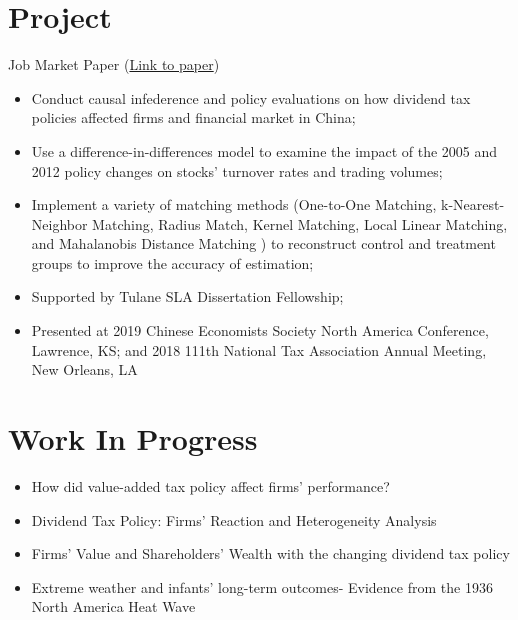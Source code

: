 \documentclass{resume}
\begin{document}
\section{Project}
Job Market Paper (\href{https://liberalarts.tulane.edu/sites/liberalarts.tulane.edu/files/sites/default/files/Xie%20JMP_0.pdf}{Link to paper})
\begin{itemize}
  \item Conduct causal infederence and policy evaluations on how dividend tax policies affected firms and financial market in China;
  \item Use a difference-in-differences model to examine the impact of the 2005 and 2012 policy changes on stocks’ turnover rates and trading volumes;
  \item Implement a variety of matching methods (One-to-One Matching, k-Nearest- Neighbor Matching, Radius Match, Kernel Matching, Local Linear Matching, and Mahalanobis Distance Matching ) to reconstruct control and treatment groups to improve the accuracy of estimation;
  \item Supported by Tulane SLA Dissertation Fellowship;
  \item Presented at 2019 Chinese Economists Society North America Conference, Lawrence, KS; and 2018 111th National Tax Association Annual Meeting, New Orleans, LA
\end{itemize}

\section{Work In Progress}
\begin{itemize}[parsep=0.25ex]
  \item How did value-added tax policy affect firms' performance?
  \item Dividend Tax Policy: Firms' Reaction and Heterogeneity Analysis
  \item Firms' Value and Shareholders' Wealth with the changing dividend tax policy
  \item Extreme weather and infants' long-term outcomes- Evidence from the 1936 North America Heat Wave 
\end{itemize}
\end{document}

